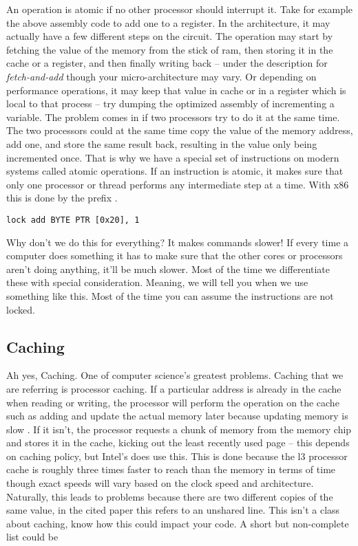 An operation is atomic if no other processor should interrupt it. Take for example the above assembly code to add one to a register.
In the architecture, it may actually have a few different steps on the circuit.
The operation may start by fetching the value of the memory from the stick of ram, then storing it in the cache or a register, and then finally writing back \cite{schweizer2015evaluating} -- under the description for \textit{fetch-and-add} though your micro-architecture may vary.
Or depending on performance operations, it may keep that value in cache or in a register which is local to that process -- try dumping the  optimized assembly of incrementing a variable.
The problem comes in if two processors try to do it at the same time.
The two processors could at the same time copy the value of the memory address, add one, and store the same result back, resulting in the value only being incremented once.
That is why we have a special set of instructions on modern systems called atomic operations.
If an instruction is atomic, it makes sure that only one processor or thread performs any intermediate step at a time.
With x86 this is done by the  prefix \cite[p. 1120]{guide2011intel}.

\begin{lstlisting}
lock add BYTE PTR [0x20], 1
\end{lstlisting}

Why don't we do this for everything?
It makes commands slower! If every time a computer does something it has to make sure that the other cores or processors aren't doing anything, it'll be much slower.
Most of the time we differentiate these with special consideration.
Meaning, we will tell you when we use something like this.
Most of the time you can assume the instructions are not locked.

\subsection{Caching}

Ah yes, Caching.
One of computer science's greatest problems.
Caching that we are referring is processor caching.
If a particular address is already in the cache when reading or writing, the processor will perform the operation on the cache such as adding and update the actual memory later because updating memory is slow \cite[Section 3.4]{intel2015improving}.
If it isn't, the processor requests a chunk of memory from the memory chip and stores it in the cache, kicking out the least recently used page -- this depends on caching policy, but Intel's does use this.
This is done because the l3 processor cache is roughly three times faster to reach than the memory in terms of time \cite[p. 22]{levinthal2009performance} though exact speeds will vary based on the clock speed and architecture.
Naturally, this leads to problems because there are two different copies of the same value, in the cited paper this refers to an unshared line.
This isn't a class about caching, know how this could impact your code.
A short but non-complete list could be

